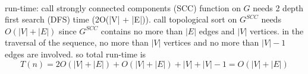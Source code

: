 \documentclass[12pt,border=4pt,multi]{article} %
\begin{document}
\\
run-time: call strongly connected components (SCC) function on $G$ needs 2 depth first search (DFS) time (2O(|V| + |E|)). call topological sort on $G^{SCC}$ needs $O(|V| + |E|)$ since $G^{SCC}$ contains no more than $|E|$ edges and $|V|$ vertices. in the traversal of the sequence, no more than $|V|$ vertices and no more than $|V| - 1$ edges are involved. so total run-time is
\[T(n) = 2O(|V| + |E|) + O(|V| + |E|) + |V| + |V| - 1 = O(|V| + |E|)\]
\end{document}
